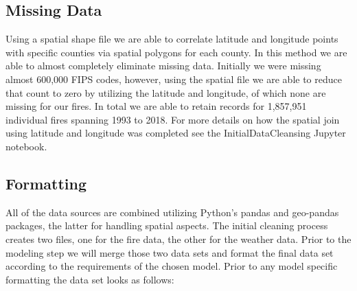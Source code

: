 \documentclass[12pt]{article}
\begin{document}
\subsection{\textrm{Missing Data}}

Using a spatial shape file we are able to correlate latitude and longitude points with specific counties via spatial polygons for each county. In this method we are able to almost completely eliminate missing data. Initially we were missing almost 600,000 FIPS codes, however, using the spatial file we are able to reduce that count to zero by utilizing the latitude and longitude, of which none are missing for our fires. In total we are able to retain records for 1,857,951 individual fires spanning 1993 to 2018. For more details on how the spatial join using latitude and longitude was completed see the InitialDataCleansing Jupyter notebook. 

\subsection{\textrm{Formatting}} 

All of the data sources are combined utilizing Python's pandas and geo-pandas packages, the latter for handling spatial aspects. The initial cleaning process creates two files, one for the fire data, the other for the weather data. Prior to the modeling step we will merge those two data sets and format the final data set according to the requirements of the chosen model. Prior to any model specific formatting the data set looks as follows: \\
\end{document}
